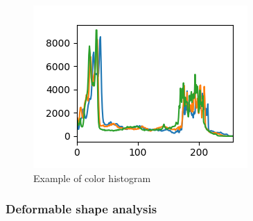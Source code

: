 \documentclass[conference]{IEEEtran}
\begin{document}
				\begin{figure}[!ht]
					\centerline{\includegraphics[width=\linewidth]{imgs/obama_histogram.png}}
					\caption{Example of color histogram}
					\label{fig:2}
				\end{figure}
				
				\subsubsection{Deformable shape analysis}
			
\end{document}
